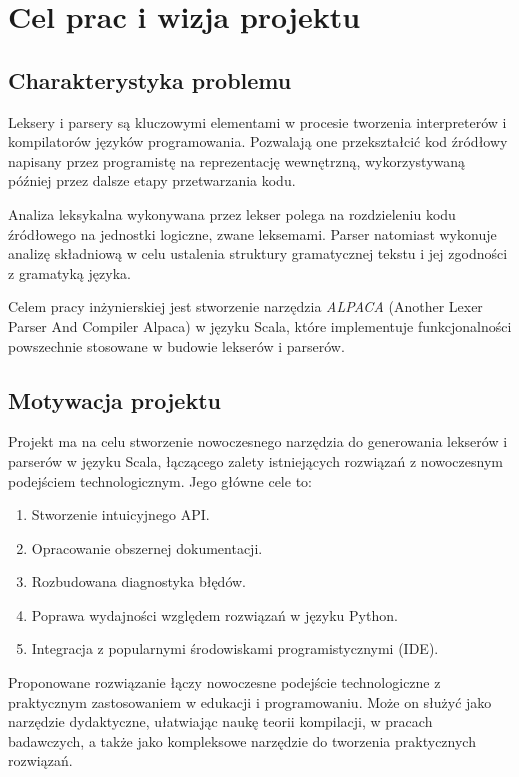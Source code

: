 \chapter{Cel prac i wizja projektu}
\label{ch:cel-wizja}


\section{Charakterystyka problemu}
\label{sec:charakterystyka-problemu}
Leksery i parsery są kluczowymi elementami w procesie tworzenia interpreterów i kompilatorów języków programowania.
Pozwalają one przekształcić kod źródłowy napisany przez programistę na reprezentację wewnętrzną, wykorzystywaną później przez dalsze etapy przetwarzania kodu.

Analiza leksykalna wykonywana przez lekser polega na rozdzieleniu kodu źródłowego na jednostki logiczne, zwane leksemami.
Parser natomiast wykonuje analizę składniową w celu ustalenia struktury gramatycznej tekstu i jej zgodności z gramatyką języka.

Celem pracy inżynierskiej jest stworzenie narzędzia \textit{ALPACA} (Another Lexer Parser And Compiler Alpaca) w języku Scala, które implementuje funkcjonalności powszechnie stosowane w budowie lekserów i parserów.


\section{Motywacja projektu}
\label{sec:motywacja-projektu}

Projekt ma na celu stworzenie nowoczesnego narzędzia do generowania lekserów i parserów w języku Scala, łączącego zalety istniejących rozwiązań z nowoczesnym podejściem technologicznym.
Jego główne cele to:
\begin{enumerate}
    \item Stworzenie intuicyjnego API\@.
    \item Opracowanie obszernej dokumentacji.
    \item Rozbudowana diagnostyka błędów.
    \item Poprawa wydajności względem rozwiązań w języku Python.
    \item Integracja z popularnymi środowiskami programistycznymi (IDE).
\end{enumerate}

Proponowane rozwiązanie łączy nowoczesne podejście technologiczne z praktycznym zastosowaniem w edukacji i programowaniu.
Może on służyć jako narzędzie dydaktyczne, ułatwiając naukę teorii kompilacji, w pracach badawczych, a także jako kompleksowe narzędzie do tworzenia praktycznych rozwiązań.


